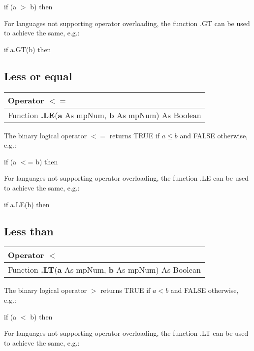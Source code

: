 \textsf{if (a $>$ b) then}

For languages not supporting operator overloading, the function \textsf{.GT} can be used to achieve the same, e.g.: 

\textsf{if a.GT(b) then}






\subsection{Less or equal}
\begin{tabular}{p{481pt}}
	\toprule
	\textsf{Operator $\boldsymbol{<=}$}\index{Multiprecision Functions!=} \\
	\midrule
	\textsf{Function \textbf{.LE}(\textbf{a} As mpNum, \textbf{b} As mpNum) As Boolean}\index{Multiprecision Functions!.LE} \\
	\bottomrule
\end{tabular}

\vspace{0.3cm}
The binary logical operator $\boldsymbol{<=}$ returns TRUE if  $a \leq b$ and FALSE otherwise, e.g.: 

\textsf{if (a $<$= b) then}

For languages not supporting operator overloading, the function \textsf{.LE} can be used to achieve the same, e.g.: 

\textsf{if a.LE(b) then}






\subsection{Less than}
\begin{tabular}{p{481pt}}
	\toprule
	\textsf{Operator $\boldsymbol{<}$}\index{Multiprecision Functions!=} \\
	\midrule
	\textsf{Function \textbf{.LT}(\textbf{a} As mpNum, \textbf{b} As mpNum) As Boolean}\index{Multiprecision Functions!.LT} \\
	\bottomrule
\end{tabular}

\vspace{0.3cm}
The binary logical operator $\boldsymbol{>}$ returns TRUE if  $a < b$ and FALSE otherwise, e.g.: 

\textsf{if (a $<$ b) then}

For languages not supporting operator overloading, the function \textsf{.LT} can be used to achieve the same, e.g.: 

